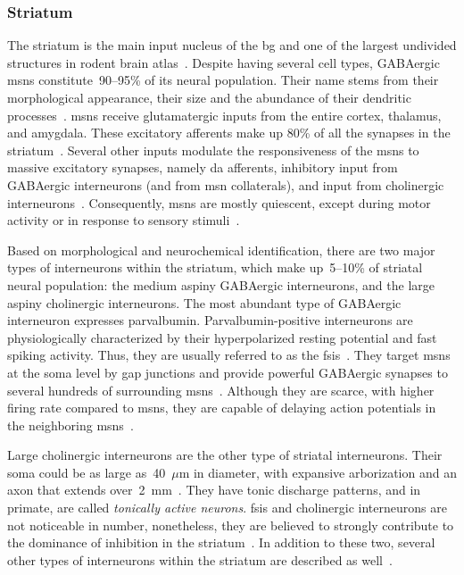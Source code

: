 \subsubsection{Striatum} \label{intro:anatomy:striatum}
The striatum is the main input nucleus of the \gls{bg} and one of the largest undivided structures in rodent brain atlas~\cite{Hintiryan2016NN,Hunnicutt2016}.
Despite having several cell types, GABAergic \glspl{msn} constitute~90--95\% of its neural population.
Their name stems from their morphological appearance, their size and the abundance of their dendritic processes~\cite{TURNER2000BasalFunction}.
\Glspl{msn} receive glutamatergic inputs from the entire cortex, thalamus, and amygdala.
These excitatory afferents make up 80\% of all the synapses in the striatum~\cite{Wilson2007GABAergicNeostriatum}.
Several other inputs modulate the responsiveness of the \glspl{msn} to massive excitatory synapses, namely \gls{da} afferents, inhibitory input from GABAergic interneurons (and from \gls{msn} collaterals), and input from cholinergic interneurons~\cite{Dudman2015Book}.
Consequently, \glspl{msn} are mostly quiescent, except during motor activity or in response to sensory stimuli~\cite{KandelBook2001}.
\par
Based on morphological and neurochemical identification, there are two major types of interneurons within the striatum, which make up~5--10\% of striatal neural population:
    the medium aspiny GABAergic interneurons, and the large aspiny cholinergic interneurons.
The most abundant type of GABAergic interneuron expresses parvalbumin.
Parvalbumin-positive interneurons are physiologically characterized by their hyperpolarized resting potential and fast spiking activity.
Thus, they are usually referred to as the \glspl{fsi}~\cite{Dudman2015Book}.
They target \glspl{msn} at the soma level by gap junctions and provide powerful GABAergic synapses to several hundreds of surrounding \glspl{msn}~\cite{Grillner2016BG, Gage2010FSI}.
Although they are scarce, with higher firing rate compared to \glspl{msn}, they are capable of delaying action potentials in the neighboring \glspl{msn}~\cite{Wilson2007GABAergicNeostriatum}.
\par
Large cholinergic interneurons are the other type of striatal interneurons.
Their soma could be as large as~40~$\mu$m in diameter, with expansive arborization and an axon that extends over~2~mm~\cite{Dudman2015Book}.
They have tonic discharge patterns, and in primate, are called \textit{tonically active neurons}.
\Glspl{fsi} and cholinergic interneurons are not noticeable in number, nonetheless, they are believed to strongly contribute to the dominance of inhibition in the striatum~\cite{Gage2010FSI}.
In addition to these two, several other types of interneurons within the striatum are described as well~\cite[see][]{Grillner2016BG, Dudman2015Book}.

